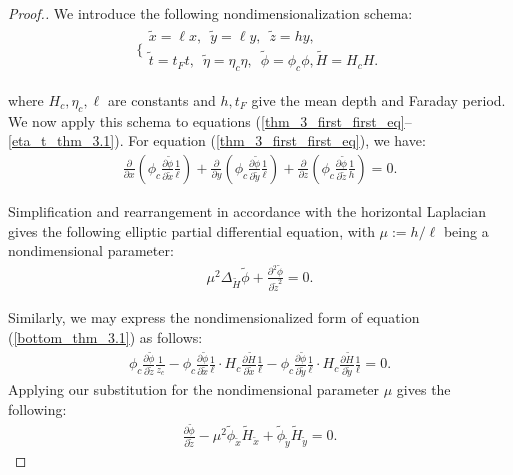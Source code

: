 \documentclass[10pt,a4paper]{amsart}
\newcommand{\ptl}{\partial}
\newcommand{\til}[1]{\widetilde{#1}}
\begin{document}
\begin{proof}[Proof.] We introduce the following nondimensionalization schema:
\begin{align*}
    \Bigg \{
    \begin{array}{ll}
      \til{x} = \ell x, \, \, \, \til{y} = \ell y, \, \, \, \til{z} = hy, \, \, \, \\
    \til{t} = t_F t, \, \, \, \til{\eta} = \eta_c \eta, \, \, \, \til{\phi} = \phi_c \phi,\til{H} = H_c H. 
    \end{array}
\end{align*}
 
where $H_c, \eta_c, \ell$ are constants and $h, t_F$ give the mean depth and Faraday period. We now apply this schema to equations (\ref{thm_3_first_first_eq}–\ref{eta_t_thm_3.1}). For equation (\ref{thm_3_first_first_eq}), we have:
\begin{align*}
    \frac{\ptl}{\ptl x} \left(\phi_c \frac{\ptl \til{\phi}}{\ptl \til{x}} \frac{1}{\ell} \right) + \frac{\ptl}{\ptl y} \left(\phi_c \frac{\ptl \til{\phi}}{\ptl \til{y}} \frac{1}{\ell} \right) + \frac{\ptl}{\ptl z} \left(\phi_c \frac{\ptl \til{\phi}}{\ptl \til{z}} \frac{1}{h} \right) = 0.
\end{align*}

Simplification and rearrangement in accordance with the horizontal Laplacian gives the following elliptic partial differential equation, with $\mu := h/\ell$ being a nondimensional parameter:
\begin{align}
\label{nondim-laplace}
    \mu^2 \Delta_{\til{H}}{\til{\phi}} + \frac{\ptl^2 \til{\phi}}{\ptl \til{z}^2} = 0.
\end{align}

Similarly, we may express the nondimensionalized form of equation (\ref{bottom_thm_3.1}) as follows:
\begin{align*}
    \phi_c \frac{\ptl \til{\phi}}{\ptl \til{z}} \frac{1}{z_c} - \phi_c  \frac{\ptl \til{\phi}}{\ptl \til{x}} \frac{1}{\ell} \cdot H_c \frac{\ptl \til{H}}{\ptl \til{x}} \frac{1}{\ell}  - \phi_c  \frac{\ptl \til{\phi}}{\ptl \til{y}} \frac{1}{\ell} \cdot H_c \frac{\ptl \til{H}}{\ptl \til{y}} \frac{1}{\ell} = 0.
\end{align*}
Applying our substitution for the nondimensional parameter $\mu$ gives the following:
\begin{align}
\label{nondim-bottom}
    \frac{\ptl \til{\phi}}{\ptl \til{z}} - \mu^2{\til{\phi}_{\til{x}} \til{H}_{\til{x}} + \til{\phi}_{\til{y}} \til{H}_{\til{y}}} = 0.
\end{align}


\end{proof}
\end{document}
